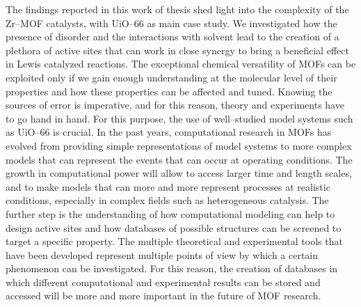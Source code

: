 The findings reported in this work of thesis shed light into the complexity of the Zr--MOF catalysts, with UiO--66 as main case study. We investigated how the presence of disorder and the interactions with solvent lead to the creation of a plethora of active sites that can work in close synergy to bring a beneficial effect in Lewis catalyzed reactions. The exceptional chemical versatility of MOFs can be exploited only if we gain enough understanding at the molecular level of their properties and how these properties can be affected and tuned. Knowing the sources of error is imperative, and for this reason, theory and experiments have to go hand in hand. For this purpose, the use of well--studied model systems such as UiO--66 is crucial. In the past years, computational research in MOFs has evolved from providing simple representations of model systems to more complex models that can represent the events that can occur at operating conditions. The growth in computational power will allow to access larger time and length scales, and to make models that can more and more represent processes at realistic conditions, especially in complex fields such as heterogeneous catalysis. The further step is the understanding of how computational modeling can help to design active sites and how databases of possible structures can be screened to target a specific property. The multiple theoretical and experimental tools that have been developed represent multiple points of view by which a certain phenomenon can be investigated. For this reason, the creation of databases in which different computational and experimental results can be stored and accessed will be more and more important in the future of MOF research. 
